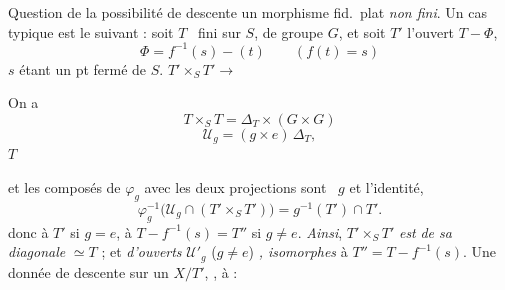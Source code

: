 \documentclass[11pt,a4paper]{article}
\begin{document}

Question de la possibilité de descente
 un morphisme fid.\ plat
\emph{non fini}. Un cas typique est le suivant : soit
\struck{\ill{}} $T$  \ fini sur $S$, de groupe $G$, et
\struck{\ill{}} soit $T'$ l'ouvert
 $T - \Phi$, 
\[
\Phi = f^{-1}(s) - (t) \qquad (f(t) = s)
\]
$s$ étant un pt fermé de $S$.
  $T' \times_S T' \to$ \ill{}


On a
\[
T \times_S T = \Delta_T \times (G \times G)
\]
 \ill{} \ill{} \ill{} \ill{} \ill{} \ill{}
\[
\mathcal{U}_g = (g \times e)\, \Delta_T ,
\]
\struck{\ill{}} \ill{} \ill{} \ill{} 
 $T$  \ill{}


et  \ill{} les composés
de $\varphi_g$ avec les deux projections sont \ $g$ et
l'identité, \ill{}
\[
\varphi_g^{-1}\bigl(\mathcal{U}_g \cap (T' \times_S T')\bigr)
= g^{-1}(T') \cap T' .
\]
  donc  à $T'$ si $g = e$,
à $T - f^{-1}(s) = T''$ si $g \neq e$.
\emph{Ainsi}, $T' \times_S T'$ \emph{est}
  
\emph{de sa diagonale} $\simeq T$ ; et
\emph{d'ouverts}
$\mathcal{U}'_g$ ($g \neq e$) \emph{, isomorphes} à
$T'' = T - f^{-1}(s)$.
Une donnée de descente sur
un $X / T'$, ,  à  :
 
\end{document}
